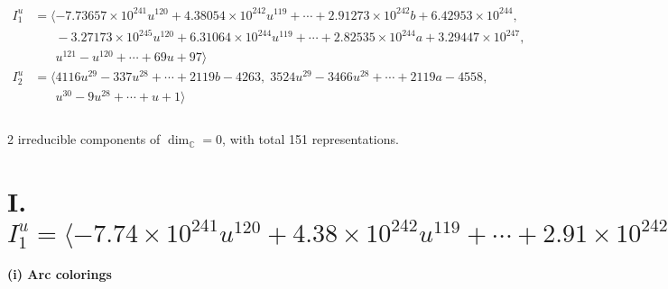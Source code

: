 \documentclass[1p]{elsarticle_modified}
\theoremstyle{definition}
\begin{document}
\begin{align*}
I^u_{1}&=\langle 
-7.73657\times10^{241} u^{120}+4.38054\times10^{242} u^{119}+\cdots+2.91273\times10^{242} b+6.42953\times10^{244},\\
\phantom{I^u_{1}}&\phantom{= \langle  }-3.27173\times10^{245} u^{120}+6.31064\times10^{244} u^{119}+\cdots+2.82535\times10^{244} a+3.29447\times10^{247},\\
\phantom{I^u_{1}}&\phantom{= \langle  }u^{121}- u^{120}+\cdots+69 u+97\rangle \\
I^u_{2}&=\langle 
4116 u^{29}-337 u^{28}+\cdots+2119 b-4263,\;3524 u^{29}-3466 u^{28}+\cdots+2119 a-4558,\\
\phantom{I^u_{2}}&\phantom{= \langle  }u^{30}-9 u^{28}+\cdots+u+1\rangle \\
\\
\end{align*}
\raggedright * 2 irreducible components of $\dim_{\mathbb{C}}=0$, with total 151 representations.\\
\newpage
\renewcommand{\arraystretch}{1}
\centering \section*{I. $I^u_{1}= \langle -7.74\times10^{241} u^{120}+4.38\times10^{242} u^{119}+\cdots+2.91\times10^{242} b+6.43\times10^{244},\;-3.27\times10^{245} u^{120}+6.31\times10^{244} u^{119}+\cdots+2.83\times10^{244} a+3.29\times10^{247},\;u^{121}- u^{120}+\cdots+69 u+97 \rangle$}
\flushleft \textbf{(i) Arc colorings}\\
\end{document}
